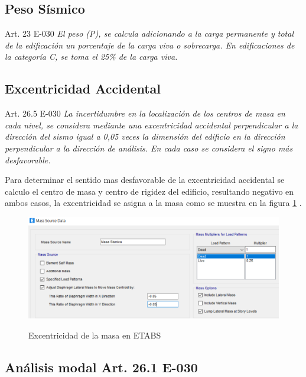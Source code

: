 \subsection{Peso Sísmico}
\begin{mybox3}{Art. 23 E-030}
\textit{El peso (P), se calcula adicionando a la carga permanente y total de la edificación un porcentaje de la carga viva o sobrecarga. En edificaciones de la categoría C, se toma el 25\% de la carga viva.}
\end{mybox3}

\subsection{Excentricidad Accidental}

\begin{mybox3}{Art. 26.5 E-030}
\textit{La incertidumbre en la localización de los centros de masa en cada nivel, se considera mediante una excentricidad accidental perpendicular a la dirección del sismo igual a 0,05 veces la dimensión del edificio en la dirección perpendicular a la dirección de análisis. En cada caso se considera el signo más desfavorable.}
\end{mybox3}
\noindent
Para determinar el sentido mas desfavorable de la excentricidad accidental se calculo el centro de masa y centro de rigidez del edificio, resultando negativo en ambos casos, la excentricidad se asigna a la masa como se muestra en la figura \ref{masa} .

\begin{figure}[h!]
    \centering
    \caption{Excentricidad de la masa en ETABS}
    \includegraphics[scale=0.7]{IMAGENES/15.PNG}
    \label{masa}
\end{figure}

\newpage
\subsection{Análisis modal Art. 26.1 E-030}

